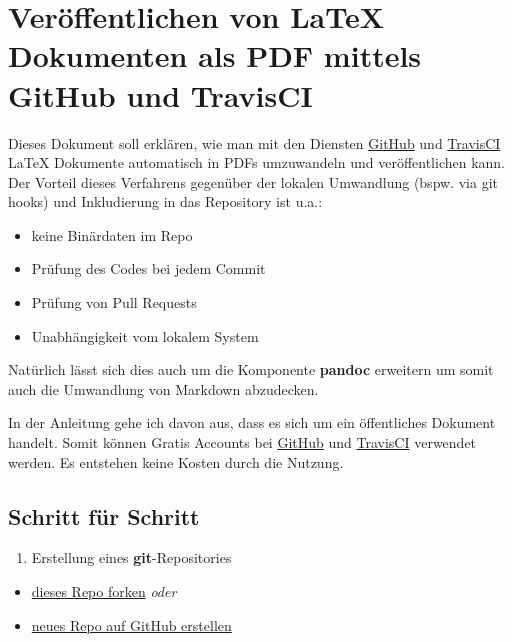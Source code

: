 \documentclass[]{article}
\date{}
\providecommand{\tightlist}{
  \setlength{\itemsep}{0pt}\setlength{\parskip}{0pt}}
\begin{document}
\section{Veröffentlichen von LaTeX Dokumenten als PDF mittels GitHub und
TravisCI}\label{veruxf6ffentlichen-von-latex-dokumenten-als-pdf-mittels-github-und-travisci}

Dieses Dokument soll erklären, wie man mit den Diensten
\href{https://github.com/}{GitHub} und
\href{https://travis-ci.org/}{TravisCI} LaTeX Dokumente automatisch in
PDFs umzuwandeln und veröffentlichen kann. Der Vorteil dieses Verfahrens
gegenüber der lokalen Umwandlung (bspw. via git hooks) und Inkludierung
in das Repository ist u.a.:

\begin{itemize}
\tightlist
\item
  keine Binärdaten im Repo
\item
  Prüfung des Codes bei jedem Commit
\item
  Prüfung von Pull Requests
\item
  Unabhängigkeit vom lokalem System
\end{itemize}

Natürlich lässt sich dies auch um die Komponente \textbf{pandoc}
erweitern um somit auch die Umwandlung von Markdown abzudecken.

In der Anleitung gehe ich davon aus, dass es sich um ein öffentliches
Dokument handelt. Somit können Gratis Accounts bei
\href{https://github.com/}{GitHub} und
\href{https://travis-ci.org/}{TravisCI} verwendet werden. Es entstehen
keine Kosten durch die Nutzung.

\subsection{Schritt für Schritt}\label{schritt-fuxfcr-schritt}

\begin{enumerate}
\def\labelenumi{\arabic{enumi}.}
\tightlist
\item
  Erstellung eines \textbf{git}-Repositories
\end{enumerate}

\begin{itemize}
\tightlist
\item
  \href{https://github.com/SimonWaldherr/golang-examples\#fork-destination-box}{dieses
  Repo forken} \emph{oder}
\item
  \href{https://github.com/new}{neues Repo auf GitHub erstellen}
\end{itemize}
\end{document}
